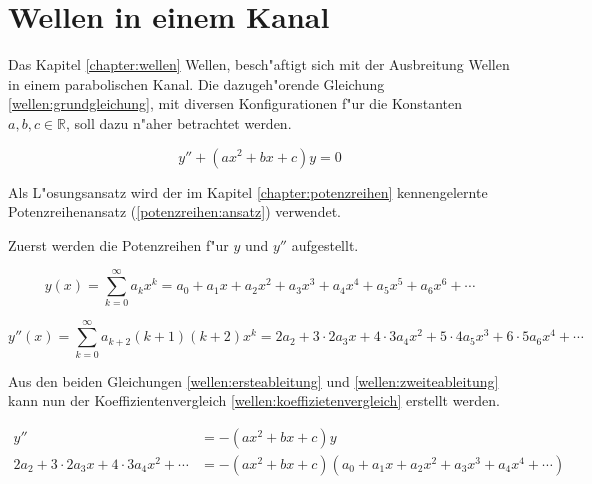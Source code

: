 \chapter{Wellen in einem Kanal\label{chapter:wellen}}
\begin{refsection}
\clearpage

Das Kapitel \ref{chapter:wellen} Wellen, besch"aftigt sich mit der Ausbreitung 
Wellen in einem parabolischen Kanal. Die dazugeh"orende Gleichung 
\ref{wellen:grundgleichung}, mit diversen Konfigurationen f"ur die Konstanten 
${a,b,c} \in \mathbb{R}$, soll dazu n"aher betrachtet werden.

\begin{equation}
	y'' + (ax^2+bx+c)y
	=
	0
	\label{wellen:grundgleichung}
\end{equation}

Als L"osungsansatz wird der im Kapitel \ref{chapter:potenzreihen} 
kennengelernte Potenzreihenansatz (\ref{potenzreihen:ansatz}) verwendet.

Zuerst werden die Potenzreihen f"ur $y$ und $y''$ aufgestellt.

\begin{equation}
	y(x)
	=
	\sum_{k = 0}^{\infty} a_{k}x^k
	=
	a_0 + a_1x + a_2x^2 + a_3x^3 + a_4x^4 + a_5x^5 + a_6x^6 + \dotsb
	\label{wellen:ersteableitung}
\end{equation}

\begin{equation}
	y''(x)
	=
	\sum_{k = 0}^{\infty} a_{k+2}(k+1)(k+2)x^k
	=
	2a_2 + 3 \mathbin{\cdot} 2a_3x + 4 \mathbin{\cdot} 3a_4x^2 + 5 
	\mathbin{\cdot} 4a_5x^3 + 6 \mathbin{\cdot} 5a_6x^4 + \dotsb
	\label{wellen:zweiteableitung}
\end{equation}

Aus den beiden Gleichungen \ref{wellen:ersteableitung} und 
\ref{wellen:zweiteableitung} kann nun der Koeffizientenvergleich 
\ref{wellen:koeffizietenvergleich} erstellt werden.

\begin{equation}
	\begin{split}
		y''
		&=
		-(ax^2+bx+c)y \\
		2a_2 + 3 \mathbin{\cdot} 2a_3x + 4 \mathbin{\cdot} 3a_4x^2 + \dotsb
		&=
		-(ax^2+bx+c)(a_0 + a_1x + a_2x^2 + a_3x^3 + a_4x^4 + \dotsb)
	\end{split}
	\label{wellen:koeffizietenvergleich}
\end{equation}


\end{refsection}
